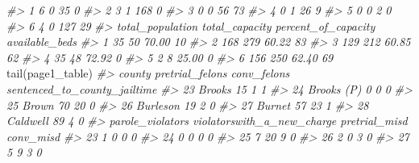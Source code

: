 \documentclass[
  12pt,
]{book}
\newenvironment{Shaded}{\begin{snugshade}}{\end{snugshade}}
\newcommand{\CommentTok}[1]{\textcolor[rgb]{0.37,0.37,0.37}{\textit{#1}}}
\newcommand{\FunctionTok}[1]{\textcolor[rgb]{0,0,0}{#1}}
\newcommand{\NormalTok}[1]{#1}
\begin{document}
\begin{Shaded}
\begin{Highlighting}[]
\CommentTok{\#\textgreater{} 1                          6            0          35              0}
\CommentTok{\#\textgreater{} 2                          3            1         168              0}
\CommentTok{\#\textgreater{} 3                          0            0          56             73}
\CommentTok{\#\textgreater{} 4                          0            1          26              9}
\CommentTok{\#\textgreater{} 5                          0            0           2              0}
\CommentTok{\#\textgreater{} 6                          4            0         127             29}
\CommentTok{\#\textgreater{}   total\_population total\_capacity percent\_of\_capacity available\_beds}
\CommentTok{\#\textgreater{} 1               35             50               70.00             10}
\CommentTok{\#\textgreater{} 2              168            279               60.22             83}
\CommentTok{\#\textgreater{} 3              129            212               60.85             62}
\CommentTok{\#\textgreater{} 4               35             48               72.92              0}
\CommentTok{\#\textgreater{} 5                2              8               25.00              0}
\CommentTok{\#\textgreater{} 6              156            250               62.40             69}
\FunctionTok{tail}\NormalTok{(page1\_table)}
\CommentTok{\#\textgreater{}        county pretrial\_felons conv\_felons sentenced\_to\_county\_jailtime}
\CommentTok{\#\textgreater{} 23     Brooks              15           1                            1}
\CommentTok{\#\textgreater{} 24 Brooks (P)               0           0                            0}
\CommentTok{\#\textgreater{} 25      Brown              70          20                            0}
\CommentTok{\#\textgreater{} 26   Burleson              19           2                            0}
\CommentTok{\#\textgreater{} 27     Burnet              57          23                            1}
\CommentTok{\#\textgreater{} 28   Caldwell              89           4                            0}
\CommentTok{\#\textgreater{}    parole\_violators violatorswith\_a\_new\_charge pretrial\_misd conv\_misd}
\CommentTok{\#\textgreater{} 23                1                          0             0         0}
\CommentTok{\#\textgreater{} 24                0                          0             0         0}
\CommentTok{\#\textgreater{} 25                7                         20             9         0}
\CommentTok{\#\textgreater{} 26                2                          0             3         0}
\CommentTok{\#\textgreater{} 27                5                          9             3         0}

\end{Highlighting}
\end{Shaded}
\end{document}
